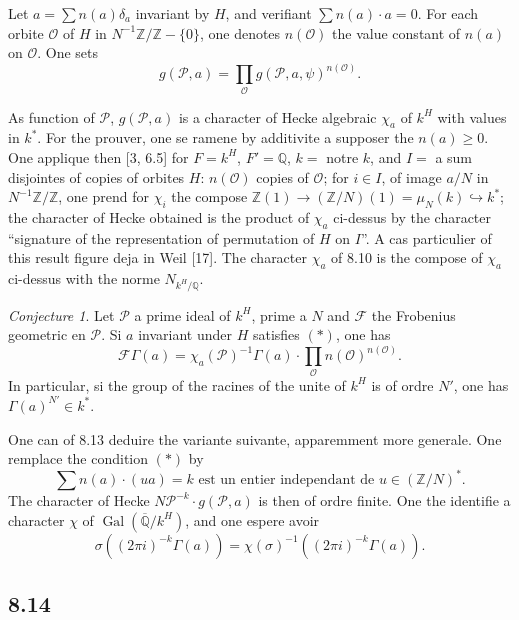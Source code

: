 \documentclass[12pt,a4paper]{article}
\theoremstyle{plain}
\theoremstyle{definition}
\theoremstyle{remark}
\newtheorem{conjecture}[definition]{Conjecture}
\DeclareMathOperator{\Gal}{Gal}
\newcommand{\Q}{\mathbb{Q}}
\newcommand{\Z}{\mathbb{Z}}
\begin{document}
Let $a = \sum n(a) \delta_a$ invariant by $H$, and verifiant $\sum n(a) \cdot a = 0$. For each
orbite $\mathcal{O}$ of $H$ in $N^{-1}\Z/\Z - \{0\}$, one denotes $n(\mathcal{O})$ the value constant of $n(a)$ on
$\mathcal{O}$. One sets
\[
g(\mathcal{P}, a) = \prod_{\mathcal{O}} g(\mathcal{P}, a, \psi)^{n(\mathcal{O})}.
\]

As function of $\mathcal{P}$, $g(\mathcal{P}, a)$ is a character of Hecke algebraic $\chi_a$ of $k^H$ with values in $k^*$. For the prouver, one se ramene by additivite a supposer the
$n(a) \geq 0$. One applique then [3, 6.5] for $F = k^H$, $F' = \Q$, $k =$ notre $k$, and
$I =$ a sum disjointes of copies of orbites $H$: $n(\mathcal{O})$ copies of $\mathcal{O}$; for $i \in I$,
of image $a/N$ in $N^{-1}\Z/\Z$, one prend for $\chi_i$ the compose
$\Z(1) \to (\Z/N)(1) = \mu_N(k) \hookrightarrow k^*$; the character of Hecke obtained is the product
of $\chi_a$ ci-dessus by the character ``signature of the representation of permutation
of $H$ on $I$''. A cas particulier of this result figure deja in Weil [17]. The
character $\chi_a$ of 8.10 is the compose of $\chi_a$ ci-dessus with the norme $N_{k^H/\Q}$.

\begin{conjecture}\label{conj:8.13}
Let $\mathcal{P}$ a prime ideal of $k^H$, prime a $N$ and $\mathcal{F}$ the Frobenius
geometric en $\mathcal{P}$. Si $a$ invariant under $H$ satisfies $(*)$, one has
\[
\mathcal{F} \Gamma(a) = \chi_a(\mathcal{P})^{-1} \Gamma(a) \cdot \prod_{\mathcal{O}} n(\mathcal{O})^{n(\mathcal{O})}.
\]
In particular, si the group of the racines of the unite of $k^H$ is of ordre $N'$, one has
$\Gamma(a)^{N'} \in k^*$.
\end{conjecture}

One can of 8.13 deduire the variante suivante, apparemment more generale. One
remplace the condition $(*)$ by
\begin{equation}\label{eq:starprime}
\sum n(a) \cdot (ua) = k \text{ est un entier independant de } u \in (\Z/N)^*.\tag{$*'$}
\end{equation}
The character of Hecke $N\mathcal{P}^{-k} \cdot g(\mathcal{P}, a)$ is then of ordre finite. One the identifie a
character $\chi$ of $\Gal(\overline{\Q}/k^H)$, and one espere avoir
\[
\sigma((2\pi i)^{-k} \Gamma(a)) = \chi(\sigma)^{-1} ((2\pi i)^{-k} \Gamma(a)).
\]

\subsection*{8.14}
\end{document}
